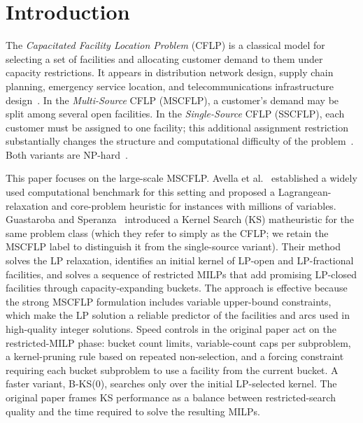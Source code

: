 \section{Introduction}
\label{sec:intro}

The \emph{Capacitated Facility Location Problem} (CFLP) is a classical model for
selecting a set of facilities and allocating customer demand to them under
capacity restrictions.
It appears in distribution network design, supply chain planning, emergency
service location, and telecommunications infrastructure
design~\citep{klose2005facility,daskin2011network,laporte2019location}.
In the \emph{Multi-Source} CFLP (MSCFLP), a customer's demand may be split
among several open facilities.
In the \emph{Single-Source} CFLP (SSCFLP), each customer must be assigned to one
facility; this additional assignment restriction substantially changes the
structure and computational difficulty of the problem~\citep{klose2005facility}.
Both variants are NP-hard~\citep{sridharan1995capacitated}.

This paper focuses on the large-scale MSCFLP.
Avella et al.~\citep{avella2008effective} established a widely used
computational benchmark for this setting and proposed a Lagrangean-relaxation
and core-problem heuristic for instances with millions of variables.
Guastaroba and Speranza~\citep{guastaroba2012kernel} introduced a
Kernel Search (KS) matheuristic for the same problem class
(which they refer to simply as the CFLP; we retain the MSCFLP label to
distinguish it from the single-source variant).
Their method solves the LP relaxation, identifies an initial kernel of
LP-open and LP-fractional facilities, and solves a sequence of restricted MILPs
that add promising LP-closed facilities through capacity-expanding buckets.
The approach is effective because the strong MSCFLP formulation includes
variable upper-bound constraints, which make the LP solution a reliable predictor
of the facilities and arcs used in high-quality integer solutions.
Speed controls in the original paper act on the restricted-MILP phase: bucket
count limits, variable-count caps per subproblem, a kernel-pruning rule based on
repeated non-selection, and a forcing constraint requiring each bucket subproblem
to use a facility from the current bucket.
A faster variant, B-KS(0), searches only over the initial LP-selected kernel.
The original paper frames KS performance as a balance between restricted-search
quality and the time required to solve the resulting MILPs.


